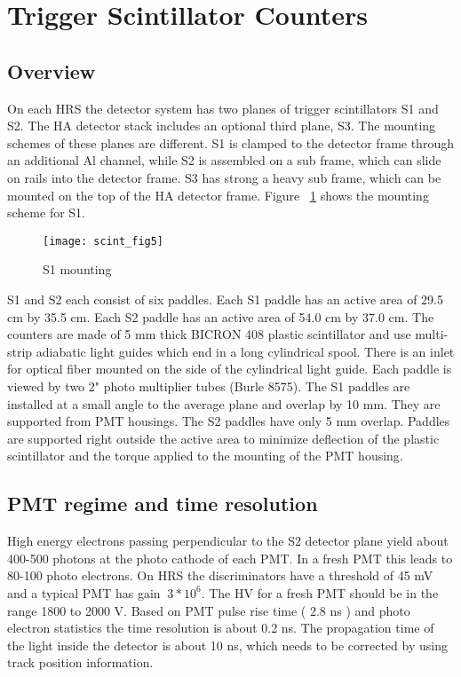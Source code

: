 \section{Trigger Scintillator Counters}
\subsection{Overview}

On each HRS the detector system has two planes of trigger
scintillators S1 and S2.
The HA detector stack includes an optional third plane, S3.
The mounting schemes
of these planes are different. S1 is clamped to the detector
frame through an additional Al channel,
while S2 is assembled on a sub frame, which can slide on rails into the
detector frame.
S3 has strong a heavy sub frame, which can be mounted on the top
of the HA detector frame. Figure ~\ref{fig:s1mount} shows the
mounting scheme for S1.

\begin{figure}[tbh]
\begin{center}
\texttt{[image: scint\_fig5]}
{\linespread{1.}
\caption[Detectors: S1 Mounting]{S1 mounting}
\label{fig:s1mount}}
\end{center}
\end{figure}


S1 and S2 each consist of six paddles. Each S1 paddle has an
active area of 29.5 cm by 35.5 cm.
Each S2 paddle has an active area of 54.0 cm by 37.0 cm. The
counters are made of 5 mm thick BICRON 
408 plastic scintillator and use multi-strip adiabatic light
guides which end in a long cylindrical spool. There is an inlet
for optical fiber mounted on the side of the 
cylindrical light guide. Each paddle is viewed by two 2" photo
 multiplier tubes (Burle 8575).
The S1 paddles are installed at a small angle to the average
plane and overlap by 10 mm. They are 
supported from PMT housings. The S2 paddles have only 5 mm
overlap. Paddles are supported right 
outside the active area to minimize deflection of the plastic
scintillator and the torque applied to the mounting of the PMT housing.   

\subsection{PMT regime and time resolution}

High energy electrons passing perpendicular to the S2 detector
plane yield about 400-500 photons at the photo cathode of each
PMT. In a fresh PMT this leads to 80-100 
photo electrons. On HRS the discriminators have a threshold of 45
mV and a typical 
PMT has gain $~ 3*10^6$. The HV for a fresh PMT should be in the
range 1800 to 2000 V. Based on PMT pulse 
rise time ( 2.8 ns ) and photo electron statistics the time
resolution is about 0.2 ns. 
The propagation time of the light inside the detector is about 10 ns,
which needs to be corrected by using track position information. 

